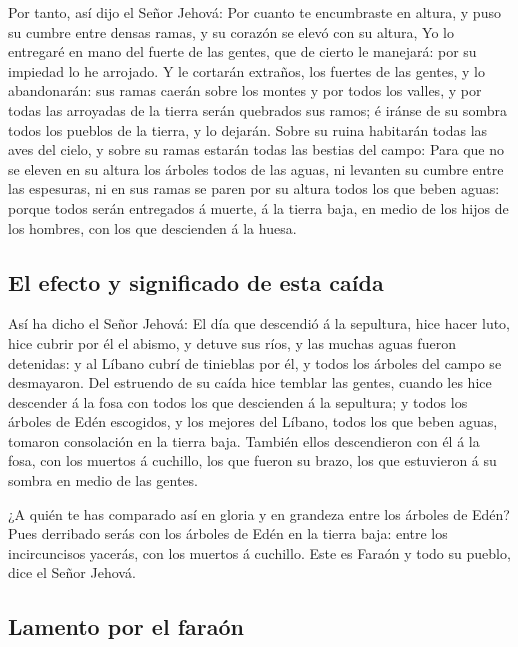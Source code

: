  Por tanto, así dijo el Señor Jehová: Por cuanto te
encumbraste en altura, y puso su cumbre entre densas ramas, y su corazón
se elevó con su altura,  Yo lo entregaré en mano del
fuerte de las gentes, que de cierto le manejará: por su impiedad lo he
arrojado.  Y le cortarán extraños, los fuertes de las
gentes, y lo abandonarán: sus ramas caerán sobre los montes y por todos
los valles, y por todas las arroyadas de la tierra serán quebrados sus
ramos; é iránse de su sombra todos los pueblos de la tierra, y lo
dejarán.  Sobre su ruina habitarán todas las aves del
cielo, y sobre su ramas estarán todas las bestias del campo:
 Para que no se eleven en su altura los árboles todos de
las aguas, ni levanten su cumbre entre las espesuras, ni en sus ramas se
paren por su altura todos los que beben aguas: porque todos serán
entregados á muerte, á la tierra baja, en medio de los hijos de los
hombres, con los que descienden á la huesa.

\hypertarget{el-efecto-y-significado-de-esta-cauxedda}{%
\subsection{El efecto y significado de esta
caída}\label{el-efecto-y-significado-de-esta-cauxedda}}

 Así ha dicho el Señor Jehová: El día que descendió á la
sepultura, hice hacer luto, hice cubrir por él el abismo, y detuve sus
ríos, y las muchas aguas fueron detenidas: y al Líbano cubrí de
tinieblas por él, y todos los árboles del campo se desmayaron.
 Del estruendo de su caída hice temblar las gentes,
cuando les hice descender á la fosa con todos los que descienden á la
sepultura; y todos los árboles de Edén escogidos, y los mejores del
Líbano, todos los que beben aguas, tomaron consolación en la tierra
baja.  También ellos descendieron con él á la fosa, con
los muertos á cuchillo, los que fueron su brazo, los que estuvieron á su
sombra en medio de las gentes.

 ¿A quién te has comparado así en gloria y en grandeza
entre los árboles de Edén? Pues derribado serás con los árboles de Edén
en la tierra baja: entre los incircuncisos yacerás, con los muertos á
cuchillo. Este es Faraón y todo su pueblo, dice el Señor Jehová.

\hypertarget{lamento-por-el-farauxf3n}{%
\subsection{Lamento por el faraón}\label{lamento-por-el-farauxf3n}}

